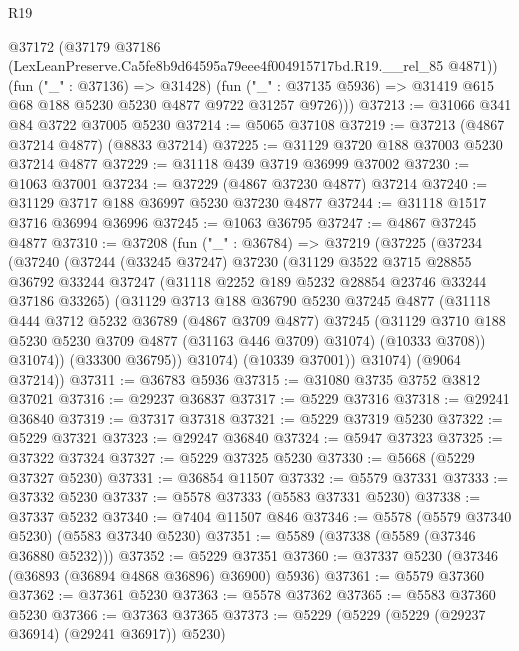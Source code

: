 \begin{lexlean}{R19}
\begin{coremodule}
      @37172
        (@37179 @37186 (LexLeanPreserve.Ca5fe8b9d64595a79eee4f004915717bd.R19.__rel_85 @4871))
        (fun ("_" : @37136) => @31428)
        (fun ("_" : @37135 @5936) => @31419 @615 @68 @188 @5230 @5230 @4877 @9722 @31257 @9726)))
@37213 := @31066 @341 @84 @3722 @37005 @5230
@37214 := @5065 @37108
@37219 := @37213 (@4867 @37214 @4877) (@8833 @37214)
@37225 := @31129 @3720 @188 @37003 @5230 @37214 @4877
@37229 := @31118 @439 @3719 @36999 @37002
@37230 := @1063 @37001
@37234 := @37229 (@4867 @37230 @4877) @37214
@37240 := @31129 @3717 @188 @36997 @5230 @37230 @4877
@37244 := @31118 @1517 @3716 @36994 @36996
@37245 := @1063 @36795
@37247 := @4867 @37245 @4877
@37310 := @37208
    (fun ("_" : @36784) =>
    @37219
      (@37225
        (@37234
          (@37240
            (@37244
              (@33245 @37247)
              @37230
              (@31129
                @3522
                @3715
                @28855
                @36792
                @33244
                @37247
                (@31118 @2252 @189 @5232 @28854 @23746 @33244 @37186 @33265)
                (@31129
                  @3713
                  @188
                  @36790
                  @5230
                  @37245
                  @4877
                  (@31118
                    @444
                    @3712
                    @5232
                    @36789
                    (@4867 @3709 @4877)
                    @37245
                    (@31129 @3710 @188 @5230 @5230 @3709 @4877 (@31163 @446 @3709) @31074)
                    (@10333 @3708))
                  @31074))
              (@33300 @36795))
            @31074)
          (@10339 @37001))
        @31074)
      (@9064 @37214))
@37311 := @36783 @5936
@37315 := @31080 @3735 @3752 @3812 @37021
@37316 := @29237 @36837
@37317 := @5229 @37316
@37318 := @29241 @36840
@37319 := @37317 @37318
@37321 := @5229 @37319 @5230
@37322 := @5229 @37321
@37323 := @29247 @36840
@37324 := @5947 @37323
@37325 := @37322 @37324
@37327 := @5229 @37325 @5230
@37330 := @5668 (@5229 @37327 @5230)
@37331 := @36854 @11507
@37332 := @5579 @37331
@37333 := @37332 @5230
@37337 := @5578 @37333 (@5583 @37331 @5230)
@37338 := @37337 @5232
@37340 := @7404 @11507 @846
@37346 := @5578 (@5579 @37340 @5230) (@5583 @37340 @5230)
@37351 := @5589 (@37338 (@5589 (@37346 @36880 @5232)))
@37352 := @5229 @37351
@37360 := @37337 @5230 (@37346 (@36893 (@36894 @4868 @36896) @36900) @5936)
@37361 := @5579 @37360
@37362 := @37361 @5230
@37363 := @5578 @37362
@37365 := @5583 @37360 @5230
@37366 := @37363 @37365
@37373 := @5229 (@5229 (@5229 (@29237 @36914) (@29241 @36917)) @5230)

\end{coremodule}
\end{lexlean}
